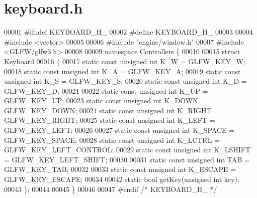\section{keyboard.\+h}
\label{keyboard_8h_source}

\begin{DoxyCode}
00001 \textcolor{preprocessor}{#ifndef KEYBOARD\_H\_}
00002 \textcolor{preprocessor}{#define KEYBOARD\_H\_}
00003 
00004 \textcolor{preprocessor}{#include <vector>}
00005 
00006 \textcolor{preprocessor}{#include "engine/window.h"}
00007 \textcolor{preprocessor}{#include <GLFW/glfw3.h>}
00008 
00009 \textcolor{keyword}{namespace }Controllers \{
00010     
00015     \textcolor{keyword}{struct }Keyboard
00016     \{
00017         \textcolor{keyword}{static} \textcolor{keyword}{const} \textcolor{keywordtype}{unsigned} \textcolor{keywordtype}{int} K\_W = GLFW\_KEY\_W;
00018         \textcolor{keyword}{static} \textcolor{keyword}{const} \textcolor{keywordtype}{unsigned} \textcolor{keywordtype}{int} K\_A = GLFW\_KEY\_A;
00019         \textcolor{keyword}{static} \textcolor{keyword}{const} \textcolor{keywordtype}{unsigned} \textcolor{keywordtype}{int} K\_S = GLFW\_KEY\_S;
00020         \textcolor{keyword}{static} \textcolor{keyword}{const} \textcolor{keywordtype}{unsigned} \textcolor{keywordtype}{int} K\_D = GLFW\_KEY\_D;
00021 
00022         \textcolor{keyword}{static} \textcolor{keyword}{const} \textcolor{keywordtype}{unsigned} \textcolor{keywordtype}{int} K\_UP    = GLFW\_KEY\_UP;
00023         \textcolor{keyword}{static} \textcolor{keyword}{const} \textcolor{keywordtype}{unsigned} \textcolor{keywordtype}{int} K\_DOWN  = GLFW\_KEY\_DOWN;
00024         \textcolor{keyword}{static} \textcolor{keyword}{const} \textcolor{keywordtype}{unsigned} \textcolor{keywordtype}{int} K\_RIGHT = GLFW\_KEY\_RIGHT;
00025         \textcolor{keyword}{static} \textcolor{keyword}{const} \textcolor{keywordtype}{unsigned} \textcolor{keywordtype}{int} K\_LEFT  = GLFW\_KEY\_LEFT;
00026 
00027         \textcolor{keyword}{static} \textcolor{keyword}{const} \textcolor{keywordtype}{unsigned} \textcolor{keywordtype}{int} K\_SPACE = GLFW\_KEY\_SPACE;
00028         \textcolor{keyword}{static} \textcolor{keyword}{const} \textcolor{keywordtype}{unsigned} \textcolor{keywordtype}{int} K\_LCTRL = GLFW\_KEY\_LEFT\_CONTROL;
00029         \textcolor{keyword}{static} \textcolor{keyword}{const} \textcolor{keywordtype}{unsigned} \textcolor{keywordtype}{int} K\_LSHIFT = GLFW\_KEY\_LEFT\_SHIFT;
00030         
00031         \textcolor{keyword}{static} \textcolor{keyword}{const} \textcolor{keywordtype}{unsigned} \textcolor{keywordtype}{int} TAB = GLFW\_KEY\_TAB;
00032 
00033         \textcolor{keyword}{static} \textcolor{keyword}{const} \textcolor{keywordtype}{unsigned} \textcolor{keywordtype}{int} K\_ESCAPE = GLFW\_KEY\_ESCAPE;
00034 
00042         \textcolor{keyword}{static} \textcolor{keywordtype}{bool} getKey(\textcolor{keywordtype}{unsigned} \textcolor{keywordtype}{int} key);
00043     \};
00044 
00045 \}
00046 
00047 \textcolor{preprocessor}{#endif }\textcolor{comment}{/* KEYBOARD\_H\_ */}\textcolor{preprocessor}{}
\end{DoxyCode}
